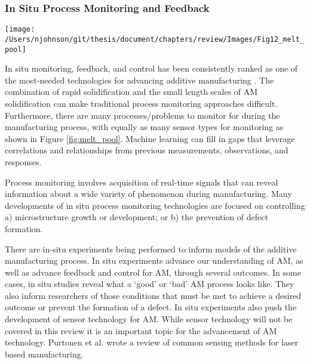 \subsubsection{In Situ Process Monitoring and Feedback}\label{sec:In Situ Process Monitoring and Feedback}
\begin{figure*}
	\texttt{[image: /Users/njohnson/git/thesis/document/chapters/review/Images/Fig12\_melt\_pool]}
	\caption{A few examples of data types, data sensors, and features to detect in a laser powder bed fusion manufacturing process. The wide range of signals to monitor then control makes feedback and control in AM especially difficult. Computer vision techniques can be applied to automatically detect features of interest across multiple data types and data sensor simultaneously.}
	\label{fig:melt_pool}
\end{figure*}

In situ monitoring, feedback, and control has been consistently ranked as one of the most-needed technologies for advancing additive manufacturing \cite{Berumen2010, Tapia2014, Mani2017}. The combination of rapid solidification and the small length scales of AM solidification can make traditional process monitoring approaches difficult. Furthermore, there are many processes/problems to monitor for during the manufacturing process, with equally as many sensor types for monitoring as shown in Figure \ref{fig:melt_pool}. Machine learning can fill in gaps that leverage correlations and relationships from previous measurements, observations, and responses.

Process monitoring involves acquisition of real-time signals that can reveal information about a wide variety of phenomenon during manufacturing. Many developments of in situ process monitoring technologies are focused on controlling a) microstructure growth or development; or b) the prevention of defect formation. 

There are in-situ experiments being performed to inform models of the additive manufacturing process. In situ experiments advance our understanding of AM, as well as advance feedback and control for AM, through several outcomes. In some cases,  in situ studies reveal what a `good' or `bad' AM process looks like. They also inform researchers of those conditions that must be met to achieve a desired outcome or prevent the formation of a defect. In situ experiments also push the development of sensor technology for AM. While sensor technology will not be covered in this review it is an important topic for the advancement of AM technology. Purtonen et al. wrote a review of common sensing methods for laser based manufacturing\cite{Purtonen2014}.

